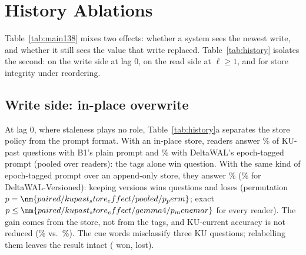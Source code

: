 \section{History Ablations}
\label{sec:history}

Table~\ref{tab:main138} mixes two effects: whether a system sees the newest write, and whether it still sees the value that write replaced. Table~\ref{tab:history} isolates the second: on the write side at lag 0, on the read side at $\ell \geq 1$, and for store integrity under reordering.



\subsection{Write side: in-place overwrite}
\label{sec:hist-write}

At lag 0, where staleness plays no role, Table~\ref{tab:history}a separates the store policy from the prompt format. With an in-place store, readers answer \% of KU-past questions with B1's plain prompt and \% with DeltaWAL's epoch-tagged prompt (pooled over readers): the tags alone win  question. With the same kind of epoch-tagged prompt over an append-only store, they answer \% (\% for DeltaWAL-Versioned): keeping versions wins  questions and loses  (permutation $p=\nm{paired/kupast_store_effect/pooled/p_perm}$; exact $p\leq\nm{paired/kupast_store_effect/gemma4/p_mcnemar}$ for every reader). The gain comes from the store, not from the tags, and KU-current accuracy is not reduced (\% vs.\ \%). The cue words misclassify three KU questions; relabelling them leaves the result intact ( won,  lost).

